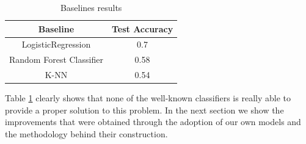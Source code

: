 \documentclass[10pt,conference,compsocconf]{IEEEtran}
\begin{document}
\begin{table}[H]
\caption{Baselines results}
\label{tab:baselineres}
\centering
\begin{tabular}{ | c | c | }
\hline
Baseline & Test Accuracy  \\
\hline
LogisticRegression & 0.7 \\
\hline
Random Forest Classifier & 0.58 \\
\hline
K-NN & 0.54 \\
\hline
\end{tabular}
\end{table}


Table \ref{tab:baselineres} clearly shows that none of the well-known classifiers is really able to provide a proper solution to this problem. In the next section we show the improvements that were obtained through the adoption of our own models and the methodology behind their construction. 
\end{document}
